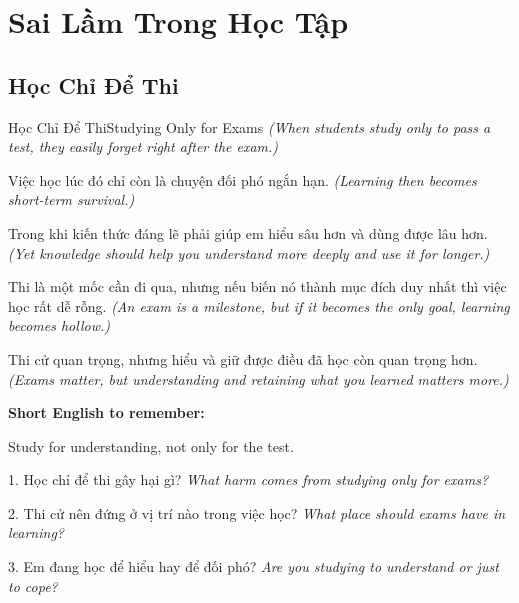 \chapter{Sai Lầm Trong Học Tập}

\section{Học Chỉ Để Thi}
\begin{truyen}{Học Chỉ Để Thi}{Studying Only for Exams}
\textit{(When students study only to pass a test, they easily forget right after the exam.)}

Việc học lúc đó chỉ còn là chuyện đối phó ngắn hạn.
\textit{(Learning then becomes short-term survival.)}

Trong khi kiến thức đáng lẽ phải giúp em hiểu sâu hơn và dùng được lâu hơn.
\textit{(Yet knowledge should help you understand more deeply and use it for longer.)}

Thi là một mốc cần đi qua, nhưng nếu biến nó thành mục đích duy nhất thì việc học rất dễ rỗng.
\textit{(An exam is a milestone, but if it becomes the only goal, learning becomes hollow.)}
\end{truyen}

\begin{baihoc}
Thi cử quan trọng, nhưng hiểu và giữ được điều đã học còn quan trọng hơn.
\textit{(Exams matter, but understanding and retaining what you learned matters more.)}
\end{baihoc}

\begin{ghinhoanh}
\textbf{Short English to remember:}

Study for understanding, not only for the test.

\end{ghinhoanh}

\begin{tuhocnhanh}
1. Học chỉ để thi gây hại gì? \textit{What harm comes from studying only for exams?}

2. Thi cử nên đứng ở vị trí nào trong việc học? \textit{What place should exams have in learning?}

3. Em đang học để hiểu hay để đối phó? \textit{Are you studying to understand or just to cope?}
\end{tuhocnhanh}
\ngancach

